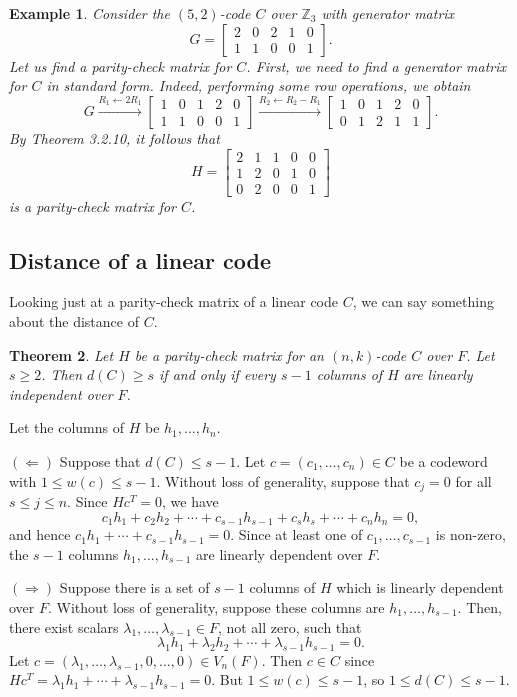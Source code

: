\documentclass[10pt]{article}
\makeatletter
\newcommand{\Z}{\mathbb{Z}}
\theoremstyle{newstyle}
\newtheorem{thm}{Theorem}[subsection]
\newtheorem{exmp}[thm]{Example}
\newenvironment{pf}[1][\proofname]{\par
  \pushQED{\qed}%
  \normalfont \topsep0\p@\relax
  \trivlist
  \item[\hskip\labelsep\scshape
  #1\@addpunct{.}]\ignorespaces
}{%
  \popQED\endtrivlist\@endpefalse
}
\makeatother
\begin{document}
\begin{exmp}
Consider the $(5, 2)$-code $C$ over $\Z_3$ with generator matrix 
\[ G = \begin{bmatrix} 2 & 0 & 2 & 1 & 0 \\ 1 & 1 & 0 & 0 & 1 \end{bmatrix}. \]
Let us find a parity-check matrix for $C$. First, we need to find a generator matrix 
for $C$ in standard form. Indeed, performing some row operations, we obtain 
\[ G \xrightarrow[]{R_1 \leftarrow 2R_1} \begin{bmatrix} 1 & 0 & 1 & 2 & 0 \\ 1 & 1 & 0 & 0 & 1 
\end{bmatrix} \xrightarrow[]{R_2 \leftarrow R_2 - R_1} 
\begin{bmatrix} 1 & 0 & 1 & 2 & 0 \\ 0 & 1 & 2 & 1 & 1 \end{bmatrix}. \]
By Theorem 3.2.10, it follows that 
\[ H = \begin{bmatrix} 2 & 1 & 1 & 0 & 0 \\ 1 & 2 & 0 & 1 & 0 \\ 0 & 2 & 0 & 0 & 1 \end{bmatrix} \]
is a parity-check matrix for $C$. 
\end{exmp}

\subsection{Distance of a linear code}

Looking just at a parity-check matrix of a linear code $C$, we can say something about the 
distance of $C$. 

\begin{thm}
Let $H$ be a parity-check matrix for an $(n, k)$-code $C$ over $F$. Let $s \geq 2$. 
Then $d(C) \geq s$ if and only if every $s-1$ columns of $H$ are linearly independent over $F$.
\end{thm}
\begin{pf}
Let the columns of $H$ be $h_1, \dots, h_n$. 

$(\Leftarrow)$ Suppose that $d(C) \leq s-1$. Let $c = (c_1, \dots, c_n) \in C$ be a codeword 
with $1 \leq w(c) \leq s-1$. Without loss of generality, suppose that $c_j = 0$
for all $s \leq j \leq n$. Since $Hc^T = 0$, we have 
\[ c_1h_1 + c_2h_2 + \cdots + c_{s-1}h_{s-1} + c_sh_s + \cdots + c_nh_n = 0, \]
and hence $c_1h_1 + \cdots + c_{s-1}h_{s-1} = 0$. Since at least one of $c_1, \dots, c_{s-1}$ 
is non-zero, the $s-1$ columns $h_1, \dots, h_{s-1}$ are linearly dependent over $F$. 

$(\Rightarrow)$ Suppose there is a set of $s-1$ columns of $H$ which is linearly dependent over $F$. 
Without loss of generality, suppose these columns are $h_1, \dots, h_{s-1}$. Then, there 
exist scalars $\lambda_1, \dots, \lambda_{s-1} \in F$, not all zero, such that 
\[ \lambda_1h_1 + \lambda_2 h_2 + \cdots + \lambda_{s-1} h_{s-1} = 0. \]
Let $c = (\lambda_1, \dots, \lambda_{s-1}, 0, \dots, 0) \in V_n(F)$. Then $c \in C$ 
since $Hc^T = \lambda_1h_1 + \cdots + \lambda_{s-1}h_{s-1} = 0$. But $1 \leq w(c) \leq s-1$, 
so $1 \leq d(C) \leq s-1$. 
\end{pf}
\end{document}
